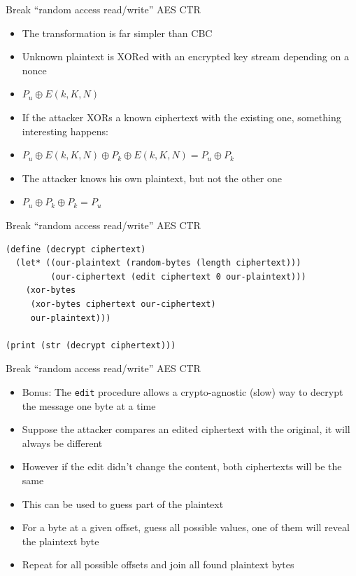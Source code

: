 \documentclass[presentation]{beamer}
\begin{document}
\begin{frame}[label=sec-2-25]{Break “random access read/write” AES CTR}
\begin{itemize}
\item The transformation is far simpler than CBC
\item Unknown plaintext is XORed with an encrypted key stream depending on
a nonce
\item $P_u \oplus E(k, K, N)$
\item If the attacker XORs a known ciphertext with the existing one,
something interesting happens:
\item $P_u \oplus E(k, K, N) \oplus P_k \oplus E(k, K, N) = P_u \oplus P_k$
\item The attacker knows his own plaintext, but not the other one
\item $P_u \oplus P_k \oplus P_k = P_u$
\end{itemize}
\end{frame}

\begin{frame}[fragile,label=sec-2-26]{Break “random access read/write” AES CTR}
 \begin{verbatim}
(define (decrypt ciphertext)
  (let* ((our-plaintext (random-bytes (length ciphertext)))
         (our-ciphertext (edit ciphertext 0 our-plaintext)))
    (xor-bytes
     (xor-bytes ciphertext our-ciphertext)
     our-plaintext)))

(print (str (decrypt ciphertext)))
\end{verbatim}
\end{frame}

\begin{frame}[fragile,label=sec-2-27]{Break “random access read/write” AES CTR}
 \begin{itemize}
\item Bonus: The \texttt{edit} procedure allows a crypto-agnostic (slow) way to
decrypt the message one byte at a time
\item Suppose the attacker compares an edited ciphertext with the
original, it will always be different
\item However if the edit didn't change the content, both ciphertexts will
be the same
\item This can be used to guess part of the plaintext
\item For a byte at a given offset, guess all possible values, one of them
will reveal the plaintext byte
\item Repeat for all possible offsets and join all found plaintext bytes
\end{itemize}
\end{frame}
\end{document}
